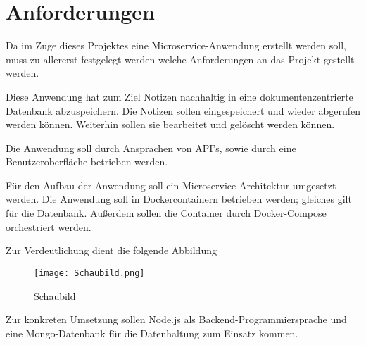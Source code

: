 
\chapter{Anforderungen}
\label{ch:Anforderungen}

Da im Zuge dieses Projektes eine Microservice-Anwendung erstellt werden soll, muss zu allererst festgelegt werden welche Anforderungen an das Projekt gestellt werden.

Diese Anwendung hat zum Ziel Notizen nachhaltig in eine dokumentenzentrierte Datenbank abzuspeichern. Die Notizen sollen eingespeichert und wieder abgerufen werden können. Weiterhin sollen sie bearbeitet und gelöscht werden können.

Die Anwendung soll durch Ansprachen von API's, sowie durch eine Benutzeroberfläche betrieben werden.

Für den Aufbau der Anwendung soll ein Microservice-Architektur umgesetzt werden.
Die Anwendung soll in Dockercontainern betrieben werden; gleiches gilt für die Datenbank. Außerdem sollen die Container durch Docker-Compose orchestriert werden.

Zur Verdeutlichung dient die folgende Abbildung

\begin{wrapfigure}{r}{0\textwidth}
\centering
\texttt{[image: Schaubild.png]}
\vspace{3pt}
\caption{Schaubild\footnotemark}
\label{fig:blueant}
\end{wrapfigure}

Zur konkreten Umsetzung sollen Node.js als Backend-Programmiersprache und eine Mongo-Datenbank für die Datenhaltung zum Einsatz kommen.